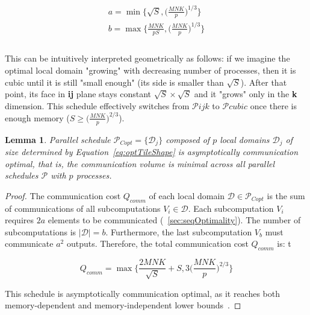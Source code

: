 \documentclass[sigplan,review,anonymous]{acmart}\settopmatter{printfolios=true,printccs=false,printacmref=false}
\newtheorem{lma}{Lemma}
\begin{document}
\begin{multline}
\\
a = \min\Big\{\sqrt{S}, \Big(\frac{MNK}{p}\Big)^{1/3} \Big\}\\
b = \max\Big\{\frac{MNK}{pS}, \Big(\frac{MNK}{p}\Big)^{1/3} \Big\}\\
\label{eq:optTileShape}
\end{multline}
\\

This can be intuitively interpreted geometrically as follows: if we 
imagine the 
optimal local domain "growing" with decreasing number of processes, 
then it is 
cubic until it is still "small enough" (its side is smaller than 
$\sqrt{S}$). 
After that point, its face in \textbf{ij} plane stays constant 
$\sqrt{S} \times 
\sqrt{S}$ and it "grows" 
only in the \textbf{k} dimension. This schedule effectively switches 
from $\mathcal{P}ijk$ to $\mathcal{P}cubic$ once there is enough 
memory ($S \ge \big(\frac{MNK}{p}\big)^{2/3}$).

\begin{lma}
  \label{lma:parSchedule}
  Parallel schedule $\mathcal{P}_{Copt} = \{\mathcal{D}_j\}$ composed of $p$ 
  local domains $\mathcal{D}_j$ of size 
  determined by Equation~\ref{eq:optTileShape} is asymptotically 
  communication optimal, that is, the communication volume is minimal across 
  all parallel schedules $\mathcal{P}$ with $p$ processes.
\end{lma}

\begin{proof}
The communication cost $Q_{comm}$ of each local domain $\mathcal{D} \in 
\mathcal{P}_{Copt}$ is the sum of communications of all subcomputations $V_i 
\in \mathcal{D}$. Each subcomputation $V_i$ requires $2a$ elements to be 
communicated (~\cref{sec:seqOptimality}). The number of subcomputations is 
$|\mathcal{D}| = b$. Furthermore, the last subcomputation $V_b$ must 
communicate $a^2$ outputs. Therefore, the total communication cost $Q_{comm}$ 
is: 
t%


$$Q_{comm} = \max\Big\{\frac{2MNK}{\sqrt{S}} + 
S, 3\Big(\frac{MNK}{p}\Big)^{2/3}  \Big\}$$

This schedule is asymptotically communication optimal, as it reaches both 
memory-dependent and 
memory-independent lower bounds~\cite{memIndependentBound}.
\end{proof}
\end{document}
